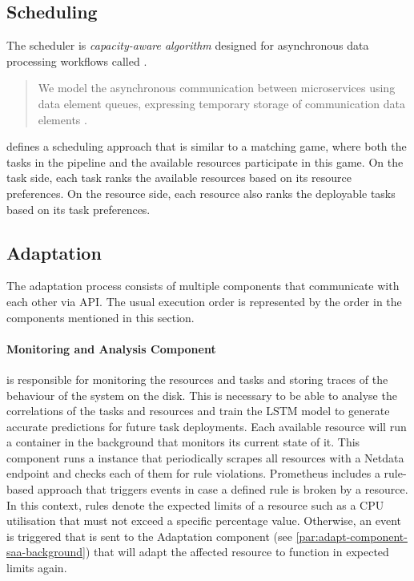   \subsection{Scheduling}
  \label{sec:scheduling-saa-background}

    The scheduler is \emph{capacity-aware algorithm} designed for asynchronous data processing workflows called \CMATCH.

    \begin{quote}
        We model the asynchronous communication between microservices using data element queues, expressing temporary storage of communication data elements \cite{mehranMatchingbasedSchedulingAsynchronous2022}.
    \end{quote} 
    \CMATCH defines a scheduling approach that is similar to a matching game, where both the tasks in the pipeline and the available resources participate in this game.
    On the task side, each task ranks the available resources based on its resource preferences.
    On the resource side, each resource also ranks the deployable tasks based on its task preferences.

  \subsection{Adaptation}
  \label{sec:adaptation-saa-background}

      The adaptation process consists of multiple components that communicate with each other via API.
      The usual execution order is represented by the order in the components mentioned in this section.
      

      \paragraph{Monitoring and Analysis Component}
      \label{par:monitoring-component-saa-background}
      
        is responsible for monitoring the resources and tasks and storing traces of the behaviour of the system on the disk.
        This is necessary to be able to analyse the correlations of the tasks and resources and train the LSTM model to generate accurate predictions for future task deployments. Each available resource will run a  container in the background that monitors its current state of it. 
        This component runs a  instance that periodically scrapes all resources with a Netdata endpoint and checks each of them for rule violations. Prometheus includes a rule-based approach that triggers events in case a defined rule is broken by a resource.
        In this context, rules denote the expected limits of a resource such as a CPU utilisation that must not exceed a specific percentage value.
        Otherwise, an event is triggered that is sent to the Adaptation component (see \ref{par:adapt-component-saa-background}) that will adapt the affected resource to function in expected limits again.
    
